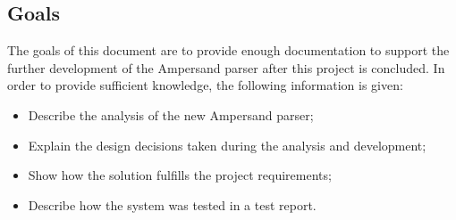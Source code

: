 
\subsection{Goals}
The goals of this document are to provide enough documentation to support the further development of the Ampersand parser after this project is concluded.
In order to provide sufficient knowledge, the following information is given:
\begin{itemize}
  \item Describe the analysis of the new Ampersand parser;
  \item Explain the design decisions taken during the analysis and development;
  \item Show how the solution fulfills the project requirements;
  \item Describe how the system was tested in a test report.
\end{itemize}
